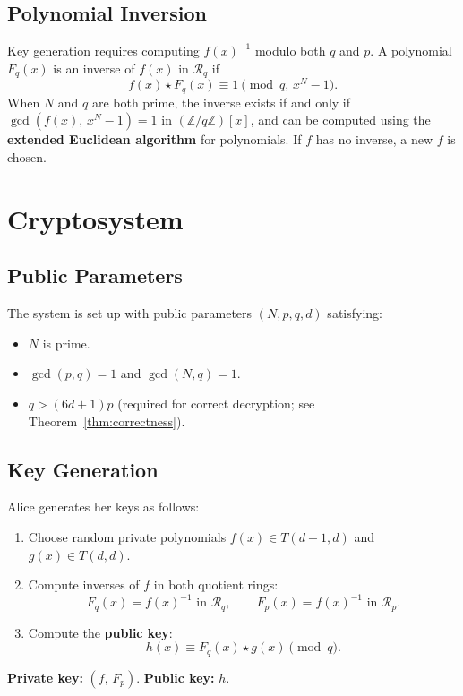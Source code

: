 \documentclass[12pt, a4paper]{article}
\theoremstyle{definition}
\theoremstyle{plain}
\newcommand{\Z}{\mathbb{Z}}
\newcommand{\R}{\mathcal{R}}
\begin{document}
\subsection{Polynomial Inversion}

Key generation requires computing $f(x)^{-1}$ modulo both $q$ and $p$.
A polynomial $F_q(x)$ is an inverse of $f(x)$ in $\R_q$ if
\[
    f(x) \star F_q(x) \equiv 1 \pmod{q, \, x^N - 1}.
\]
When $N$ and $q$ are both prime, the inverse exists if and only if
$\gcd(f(x),\, x^N - 1) = 1$ in $(\Z/q\Z)[x]$, and can be computed using the
\textbf{extended Euclidean algorithm} for polynomials. If $f$ has no inverse,
a new $f$ is chosen.

\section{Cryptosystem}

\subsection{Public Parameters}

The system is set up with public parameters $(N, p, q, d)$ satisfying:
\begin{itemize}
    \item $N$ is prime.
    \item $\gcd(p, q) = 1$ and $\gcd(N, q) = 1$.
    \item $q > (6d+1)p$ \quad (required for correct decryption; see
          Theorem~\ref{thm:correctness}).
\end{itemize}

\subsection{Key Generation}

Alice generates her keys as follows:
\begin{enumerate}
    \item Choose random private polynomials $f(x) \in T(d+1, d)$ and
          $g(x) \in T(d, d)$.
    \item Compute inverses of $f$ in both quotient rings:
          \[
              F_q(x) = f(x)^{-1} \text{ in } \R_q, \qquad
              F_p(x) = f(x)^{-1} \text{ in } \R_p.
          \]
    \item Compute the \textbf{public key}:
          \[
              h(x) \equiv F_q(x) \star g(x) \pmod{q}.
          \]
\end{enumerate}
\textbf{Private key:} $(f,\, F_p)$. \quad \textbf{Public key:} $h$.
\end{document}
